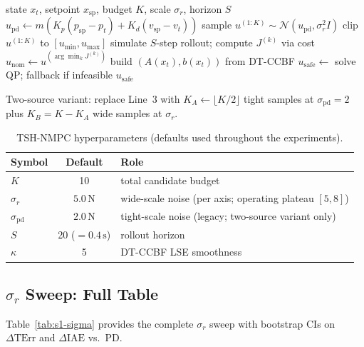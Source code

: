 \documentclass[11pt,a4paper]{article}
\newcommand{\spt}{\mathrm{sp}}
\newcommand{\pd}{\mathrm{pd}}
\newcommand{\nom}{\mathrm{nom}}
\newcommand{\safe}{\mathrm{safe}}
\newcommand{\TErr}{\mathrm{TErr}}
\newcommand{\IAE}{\mathrm{IAE}}
\begin{document}
\begin{algorithm}[h]
\caption{TSH-NMPC: one closed-loop step at state $x_t$}\label{alg:tsh-supp}
\begin{algorithmic}[1]
\Require state $x_t$, setpoint $x_\spt$, budget $K$, scale $\sigma_r$, horizon $S$
\State $u_\pd \gets m (K_p(p_\spt - p_t) + K_d(v_\spt - v_t))$ 
\State sample $u^{(1{:}K)} \sim \mathcal{N}(u_\pd, \sigma_r^2 I)$ 
\State clip $u^{(1{:}K)}$ to $[u_{\min}, u_{\max}]$
  \State simulate $S$-step rollout; compute $J^{(k)}$ via cost
\EndFor
\State $u_\nom \gets u^{(\arg\min_k J^{(k)})}$ 
\State build $(A(x_t), b(x_t))$ from DT-CCBF
\State $u_\safe \gets$ solve QP; fallback if infeasible
\State \Return $u_\safe$
\end{algorithmic}
\end{algorithm}

\noindent Two-source variant: replace Line~3 with
$K_A \gets \lfloor K/2\rfloor$ tight samples at $\sigma_\pd = 2$
plus $K_B = K - K_A$ wide samples at $\sigma_r$.

\begin{table}[h]
\centering
\caption{TSH-NMPC hyperparameters (defaults used throughout the experiments).}\label{tab:tsh-hp-supp}
\begin{tabular}{lcl}
\toprule
Symbol & Default & Role \\
\midrule
$K$ & 10 & total candidate budget \\
$\sigma_r$ & $5.0\,\mathrm{N}$ & wide-scale noise (per axis; operating plateau $[5,8]$) \\
$\sigma_\pd$ & $2.0\,\mathrm{N}$ & tight-scale noise (legacy; two-source variant only) \\
$S$ & 20 ($=0.4\,\mathrm{s}$) & rollout horizon \\
$\kappa$ & 5 & DT-CCBF LSE smoothness \\
\bottomrule
\end{tabular}
\end{table}

\subsection{$\sigma_r$ Sweep: Full Table}

Table~\ref{tab:s1-sigma} provides the complete $\sigma_r$ sweep with
bootstrap CIs on $\Delta\TErr$ and $\Delta\IAE$ vs.\ PD.
\end{document}
